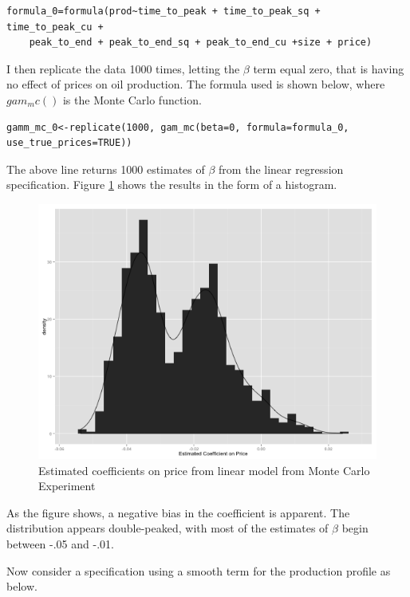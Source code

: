 \documentclass[12pt]{article}
\begin{document}
\begin{verbatim}
formula_0=formula(prod~time_to_peak + time_to_peak_sq + time_to_peak_cu + 
	peak_to_end + peak_to_end_sq + peak_to_end_cu +size + price)
\end{verbatim}

I then replicate the data 1000 times, letting the $\beta$ term equal zero, that is having no effect of prices on oil production.  The formula used is shown below, where $gam_mc()$ is the Monte Carlo function.  

\begin{verbatim}
gamm_mc_0<-replicate(1000, gam_mc(beta=0, formula=formula_0, use_true_prices=TRUE))
\end{verbatim}

The above line returns 1000 estimates of $\beta$ from the linear regression specification.  Figure \ref{lin_model_price_mc} shows the results in the form of a histogram.

\begin{figure}
	\includegraphics[width=1\textwidth]{figures/lin_model_price_mc.png}
	\caption{Estimated coefficients on price from linear model from Monte Carlo Experiment}
	\label{lin_model_price_mc}	
\end{figure}

As the figure shows, a negative bias in the coefficient is apparent.  The distribution appears double-peaked, with most of the estimates of $\beta$ begin between -.05 and -.01.   

Now consider a specification using a smooth term for the production profile as below.
\end{document}
